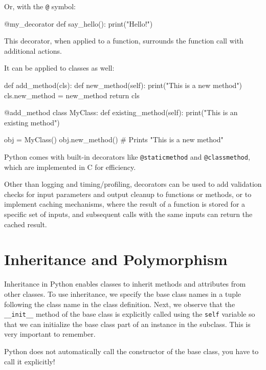 Or, with the \texttt{@} symbol:

\begin{codeblock}[language=Python]
@my_decorator
def say_hello():
    print("Hello!")
\end{codeblock}

This decorator, when applied to a function, surrounds the function call with additional actions.

It can be applied to classes as well:

\begin{codeblock}[language=Python]
def add_method(cls):
    def new_method(self):
        print("This is a new method")
    cls.new_method = new_method
    return cls

@add_method
class MyClass:
    def existing_method(self):
        print("This is an existing method")
    
obj = MyClass()
obj.new_method() # Prints "This is a new method"
\end{codeblock}

\begin{observationblock}
    Python comes with built-in decorators like \texttt{@staticmethod} and \texttt{@classmethod}, which are
    implemented in C for efficiency.
\end{observationblock}

Other than logging and timing/profiling, decorators can be used to add validation checks for
input parameters and output cleanup to functions or methods, or to implement caching
mechanisms, where the result of a function is stored for a specific set of inputs, and subsequent
calls with the same inputs can return the cached result.


\section{Inheritance and Polymorphism}

Inheritance in Python enables classes to inherit methods and attributes from other classes.
To use inheritance, we specify the base class names in a tuple following the class name in the
class definition. Next, we observe that the \texttt{\_\_init\_\_} method of the base class is explicitly called using the \texttt{self}
variable so that we can initialize the base class part of an instance in the subclass. This is very
important to remember.

\begin{warningblock}
    Python does not automatically call the constructor of the base class, you have to call it explicitly!
\end{warningblock}

